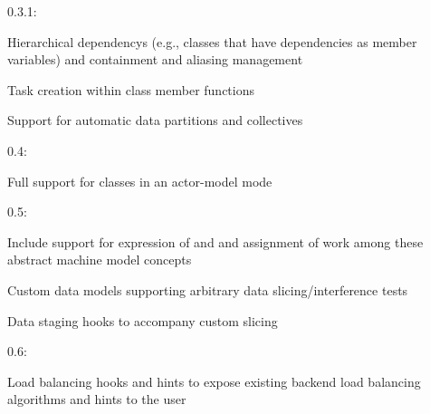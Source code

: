 \begin{compactdesc}
\item[0.3.1:]
\begin{compactitem}
\item Hierarchical \glspl{dependency} (e.g., classes that have dependencies as
member variables) and containment and aliasing management
\item Task creation within class member functions
\item Support for automatic data partitions and collectives
\end{compactitem}
\item[0.4:]
\begin{compactitem}
\item Full support for classes in an actor-model mode 
\end{compactitem}
\item[0.5:]
\begin{compactitem}
\item Include support for expression of  and
 and assignment of work among these abstract machine
model concepts
\item Custom data models supporting arbitrary data slicing/interference tests
\item Data staging hooks to accompany custom slicing
\end{compactitem}
\item[0.6:]
\begin{compactitem}
\item Load balancing hooks and hints to expose existing backend load balancing algorithms and hints to the user
\end{compactitem}
\end{compactdesc}
